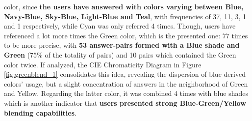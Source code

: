 color, since \textbf{the users have answered with colors varying between Blue, Navy-Blue, Sky-Blue, Light-Blue and Teal}, with frequencies
of 37, 11, 3, 1 and 1 respectively, while Cyan was only referred 4 times. Though, users have referenced a lot more times the
Green color, which is the presented one: 77 times to be more precise, with \textbf{53 answer-pairs formed with a Blue shade and Green} ($75\%$ of the
totality of pairs) and 10 pairs which contained the Green color twice. If analyzed, the CIE Chromaticity Diagram in Figure \ref{fig:greenblend_1} consolidates
this idea, revealing the dispersion of blue derived colors' usage, but a slight concentration of answers in the neighborhood of Green and Yellow.
Regarding the latter color, it was combined 4 times with blue shades which is another indicator that \textbf{users presented strong Blue-Green/Yellow blending
capabilities}.
%
